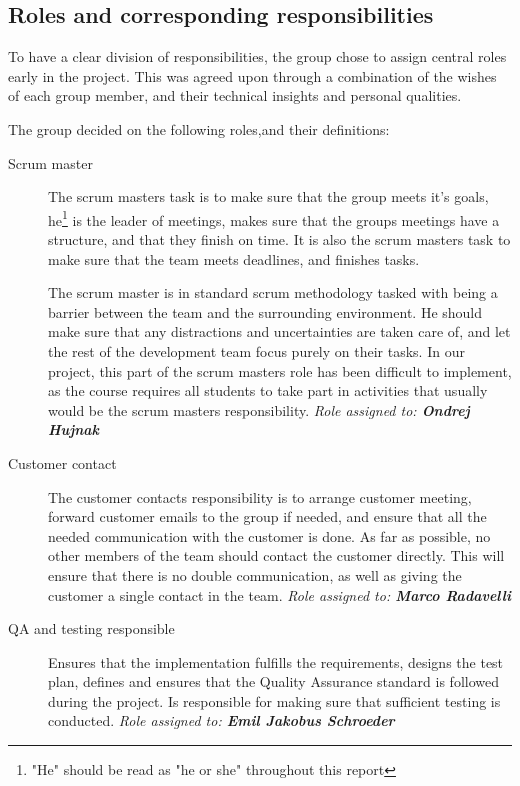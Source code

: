 \documentclass[11pt,a4paper,titlepage,oneside]{report}
\begin{document}
\subsection{Roles and corresponding responsibilities}
To have a clear division of responsibilities, the group chose to assign central roles early in the project. This was agreed upon through a combination of the wishes of each group member, and their technical insights and personal qualities. 

The group decided on the following roles,and their definitions:
\begin{description}
\item[Scrum master] The scrum masters task is to make sure that the group meets it's goals, he\footnote{"He" should be read as "he or she" throughout this report} is the leader of meetings, makes sure that the groups meetings have a structure, and that they finish on time. It is also the scrum masters task to make sure that the team meets deadlines, and finishes tasks. 

The scrum master is in standard scrum methodology tasked with being a barrier between the team and the surrounding environment. He should make sure that any distractions and uncertainties are taken care of, and let the rest of the development team focus purely on their tasks. In our project, this part of the scrum masters role has been difficult to implement, as the course requires all students to take part in activities that usually would be the scrum masters responsibility. 
\emph{Role assigned to: \textbf{Ondrej Hujnak}}

\item[Customer contact] The customer contacts responsibility is to arrange customer meeting, forward customer emails to the group if needed, and ensure that all the needed communication with the customer is done. As far as possible, no other members of the team should contact the customer directly. This will ensure that there is no double communication, as well as giving the customer a single contact in the team.
\emph{Role assigned to: \textbf{Marco Radavelli}}

\item[QA and testing responsible] Ensures that the implementation fulfills the requirements, designs the test plan, defines and ensures that the Quality Assurance standard is followed during the project. Is responsible for making sure that sufficient testing is conducted.
\emph{Role assigned to: \textbf{Emil Jakobus Schroeder}}


\end{description}
\end{document}
